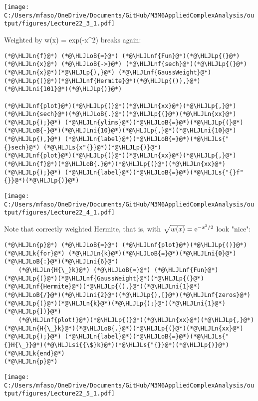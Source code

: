 \documentclass[12pt,landscape]{article}
\newcommand{\HLJLk}[1]{\textcolor[RGB]{148,91,176}{\textbf{#1}}}
\newcommand{\HLJLn}[1]{#1}
\newcommand{\HLJLnf}[1]{\textcolor[RGB]{66,102,213}{#1}}
\newcommand{\HLJLs}[1]{\textcolor[RGB]{201,61,57}{#1}}
\newcommand{\HLJLsi}[1]{#1}
\newcommand{\HLJLni}[1]{\textcolor[RGB]{59,151,46}{#1}}
\newcommand{\HLJLoB}[1]{\textcolor[RGB]{102,102,102}{\textbf{#1}}}
\newcommand{\HLJLp}[1]{#1}
\def\E{ {\rm e} }
\begin{document}
{\texttt{[image: C:/Users/mfaso/OneDrive/Documents/GitHub/M3M6AppliedComplexAnalysis/output/figures/Lecture22\_3\_1.pdf]}

Weighted by w(x) = exp(-x\^{}2) breaks again:


\begin{lstlisting}
(*@\HLJLn{f}@*) (*@\HLJLoB{=}@*) (*@\HLJLnf{Fun}@*)(*@\HLJLp{(}@*)(*@\HLJLn{x}@*) (*@\HLJLoB{->}@*) (*@\HLJLnf{sech}@*)(*@\HLJLp{(}@*)(*@\HLJLn{x}@*)(*@\HLJLp{),}@*) (*@\HLJLnf{GaussWeight}@*)(*@\HLJLp{(}@*)(*@\HLJLnf{Hermite}@*)(*@\HLJLp{()),}@*)(*@\HLJLni{101}@*)(*@\HLJLp{)}@*)

(*@\HLJLnf{plot}@*)(*@\HLJLp{(}@*)(*@\HLJLn{xx}@*)(*@\HLJLp{,}@*) (*@\HLJLn{sech}@*)(*@\HLJLoB{.}@*)(*@\HLJLp{(}@*)(*@\HLJLn{xx}@*)(*@\HLJLp{);}@*) (*@\HLJLn{ylims}@*)(*@\HLJLoB{=}@*)(*@\HLJLp{(}@*)(*@\HLJLoB{-}@*)(*@\HLJLni{10}@*)(*@\HLJLp{,}@*)(*@\HLJLni{10}@*)(*@\HLJLp{),}@*) (*@\HLJLn{label}@*)(*@\HLJLoB{=}@*)(*@\HLJLs{"{}sech}@*) (*@\HLJLs{x"{}}@*)(*@\HLJLp{)}@*)
(*@\HLJLnf{plot}@*)(*@\HLJLp{(}@*)(*@\HLJLn{xx}@*)(*@\HLJLp{,}@*) (*@\HLJLn{f}@*)(*@\HLJLoB{.}@*)(*@\HLJLp{(}@*)(*@\HLJLn{xx}@*)(*@\HLJLp{);}@*) (*@\HLJLn{label}@*)(*@\HLJLoB{=}@*)(*@\HLJLs{"{}f"{}}@*)(*@\HLJLp{)}@*)
\end{lstlisting}

\texttt{[image: C:/Users/mfaso/OneDrive/Documents/GitHub/M3M6AppliedComplexAnalysis/output/figures/Lecture22\_4\_1.pdf]}

Note that correctly weighted Hermite, that is, with $\sqrt{w(x)} = \E^{-x^2/2}$ look "nice":


\begin{lstlisting}
(*@\HLJLn{p}@*) (*@\HLJLoB{=}@*) (*@\HLJLnf{plot}@*)(*@\HLJLp{()}@*)
(*@\HLJLk{for}@*) (*@\HLJLn{k}@*)(*@\HLJLoB{=}@*)(*@\HLJLni{0}@*)(*@\HLJLoB{:}@*)(*@\HLJLni{6}@*)
    (*@\HLJLn{H{\_}k}@*) (*@\HLJLoB{=}@*) (*@\HLJLnf{Fun}@*)(*@\HLJLp{(}@*)(*@\HLJLnf{GaussWeight}@*)(*@\HLJLp{(}@*)(*@\HLJLnf{Hermite}@*)(*@\HLJLp{(),}@*)(*@\HLJLni{1}@*)(*@\HLJLoB{/}@*)(*@\HLJLni{2}@*)(*@\HLJLp{),[}@*)(*@\HLJLnf{zeros}@*)(*@\HLJLp{(}@*)(*@\HLJLn{k}@*)(*@\HLJLp{);}@*)(*@\HLJLni{1}@*)(*@\HLJLp{])}@*)
    (*@\HLJLnf{plot!}@*)(*@\HLJLp{(}@*)(*@\HLJLn{xx}@*)(*@\HLJLp{,}@*) (*@\HLJLn{H{\_}k}@*)(*@\HLJLoB{.}@*)(*@\HLJLp{(}@*)(*@\HLJLn{xx}@*)(*@\HLJLp{);}@*) (*@\HLJLn{label}@*)(*@\HLJLoB{=}@*)(*@\HLJLs{"{}H{\_}}@*)(*@\HLJLsi{{\$}k}@*)(*@\HLJLs{"{}}@*)(*@\HLJLp{)}@*)
(*@\HLJLk{end}@*)
(*@\HLJLn{p}@*)
\end{lstlisting}

\texttt{[image: C:/Users/mfaso/OneDrive/Documents/GitHub/M3M6AppliedComplexAnalysis/output/figures/Lecture22\_5\_1.pdf]}

}
\end{document}
